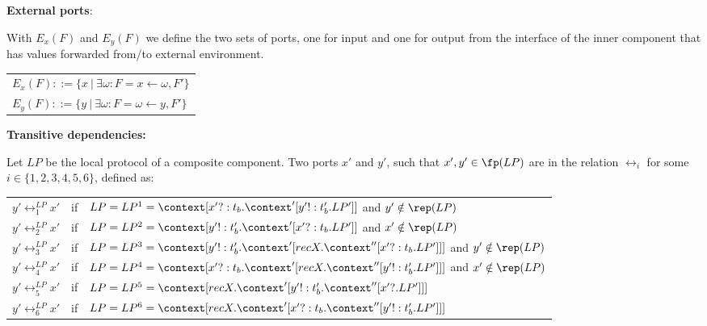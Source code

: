 \vspace{0.5cm}





\textbf{External ports}:

With $E_x(F)$ and $E_y(F)$ we define the two sets of ports, one for input and one for output from the interface of the inner component that has values forwarded from/to external environment.

\vspace{0.5cm}
\begin{tabular}{l}
     $E_x(F)::=\{x\ |\ \exists \omega : F=x\leftarrow \omega,F'\}$\\
      $E_y(F)::=\{y\ |\ \exists \omega : F=\omega \leftarrow y,F'\}$
\end{tabular}

\vspace{0.5cm}





\textbf{Transitive dependencies:}

\vspace{0.5cm}
Let $LP$ be the local protocol of a composite component. Two ports $x'$ and $y'$, such that $x',y'\in \fp(LP)$ are in the relation $\rel_i$ for some $i\in \{1,2,3,4,5,6\}$, defined as:\\

\vspace{0.5cm}

\begin{tabular}{l l l}
    
$y'\rel^{LP}_1 x'$ & if & $LP=LP^1=\context[x'?:t_b.\context'[y'!:t_b'.LP']]$ and $y'\notin \rep(LP)$\\

$y'\rel^{LP}_2 x'$ & if & $LP=LP^2=\context[y'!:t_b'.\context'[x'?:t_b.LP']]$ and $x'\notin \rep(LP)$\\
$y'\rel^{LP}_3 x'$ & if & $LP=LP^3=\context[y'!:t_b'.\context'[recX.\context''[x'?:t_b.LP']]]$ and $y'\notin \rep(LP)$\\
$y'\rel^{LP}_4 x'$ & if & $LP=LP^4=\context[x'?:t_b.\context'[recX.\context''[y'!:t_b'.LP']]]$ and $x'\notin \rep(LP)$\\
$y'\rel^{LP}_5 x'$ & if & $LP=LP^5=\context[recX.\context'[y'!:t_b'.\context''[x'?.LP']]]$\\
$y'\rel^{LP}_6 x'$ & if & $LP=LP^6=\context[recX.\context'[x'?:t_b.\context''[y'!:t_b'.LP']]]$\\


\end{tabular}

